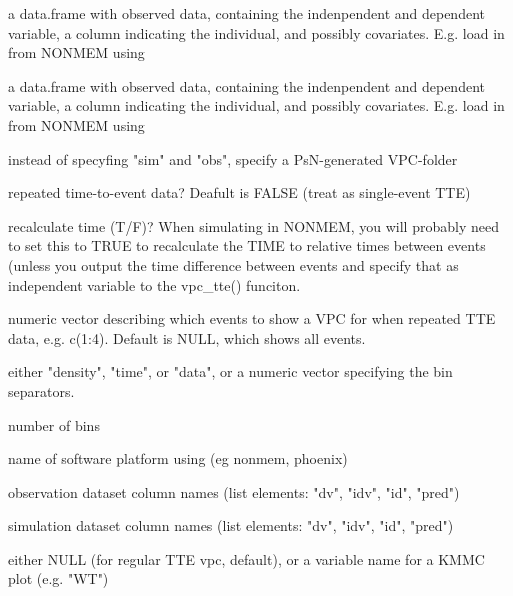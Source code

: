 \documentclass[letterpaper]{book}
\begin{document}
\begin{Arguments}
\begin{ldescription}
\item[\code{sim}] a data.frame with observed data, containing the indenpendent and dependent variable, a column indicating the individual, and possibly covariates. E.g. load in from NONMEM using 

\item[\code{obs}] a data.frame with observed data, containing the indenpendent and dependent variable, a column indicating the individual, and possibly covariates. E.g. load in from NONMEM using 

\item[\code{psn\_folder}] instead of specyfing "sim" and "obs", specify a PsN-generated VPC-folder

\item[\code{rtte}] repeated time-to-event data? Deafult is FALSE (treat as single-event TTE)

\item[\code{rtte\_calc\_diff}] recalculate time (T/F)? When simulating in NONMEM, you will probably need to set this to TRUE to recalculate the TIME to relative times between events (unless you output the time difference between events and specify that as independent variable to the vpc\_tte() funciton.

\item[\code{events}] numeric vector describing which events to show a VPC for when repeated TTE data, e.g. c(1:4). Default is NULL, which shows all events.

\item[\code{bins}] either "density", "time", or "data", or a numeric vector specifying the bin separators.

\item[\code{n\_bins}] number of bins

\item[\code{software}] name of software platform using (eg nonmem, phoenix)

\item[\code{obs\_cols}] observation dataset column names (list elements: "dv", "idv", "id", "pred")

\item[\code{sim\_cols}] simulation dataset column names (list elements: "dv", "idv", "id", "pred")

\item[\code{kmmc}] either NULL (for regular TTE vpc, default), or a variable name for a KMMC plot (e.g. "WT")


\end{ldescription}
\end{Arguments}
\end{document}
